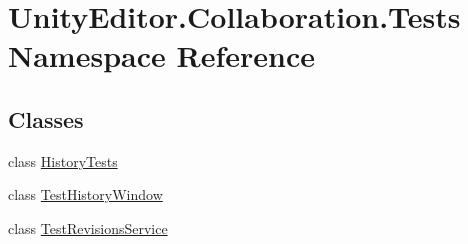 \hypertarget{namespace_unity_editor_1_1_collaboration_1_1_tests}{}\section{Unity\+Editor.\+Collaboration.\+Tests Namespace Reference}
\label{namespace_unity_editor_1_1_collaboration_1_1_tests}
\subsection*{Classes}
\begin{DoxyCompactItemize}
\item 
class \mbox{\hyperlink{class_unity_editor_1_1_collaboration_1_1_tests_1_1_history_tests}{History\+Tests}}
\item 
class \mbox{\hyperlink{class_unity_editor_1_1_collaboration_1_1_tests_1_1_test_history_window}{Test\+History\+Window}}
\item 
class \mbox{\hyperlink{class_unity_editor_1_1_collaboration_1_1_tests_1_1_test_revisions_service}{Test\+Revisions\+Service}}
\end{DoxyCompactItemize}
